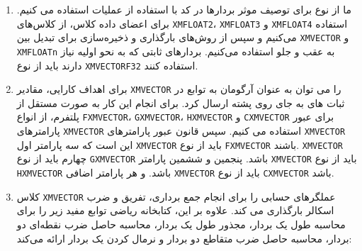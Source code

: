 {\begin{spacing}{1.5}
\begin{enumerate}
            \item {ما از نوع  برای توصیف موثر بردارها در کد با استفاده از عملیات  استفاده می کنیم.
            برای اعضای داده کلاس، از کلاس‌های \texttt{XMFLOAT2}، \texttt{XMFLOAT3} و \texttt{XMFLOAT4} استفاده می‌کنیم و
            سپس از روش‌های بارگذاری و ذخیره‌سازی برای تبدیل بین \texttt{XMVECTOR} و \texttt{XMFLOATn} به عقب و جلو استفاده می‌کنیم.
            بردارهای ثابتی که به نحو اولیه نیاز دارند باید از نوع \texttt{XMVECTORF32} استفاده کنند.}
            \\
            \item {برای اهداف کارایی، مقادیر \texttt{XMVECTOR} را می توان به عنوان آرگومان به توابع در ثبات های  به جای روی پشته ارسال کرد.
            برای انجام این کار به صورت مستقل از پلتفرم، از انواع \texttt{FXMVECTOR}، \texttt{GXMVECTOR}، \texttt{HXMVECTOR} و \texttt{CXMVECTOR} برای عبور پارامترهای \texttt{XMVECTOR} استفاده می کنیم.
            سپس قانون عبور پارامترهای \texttt{XMVECTOR} این است که سه پارامتر اول \texttt{XMVECTOR} باید از نوع \texttt{FXMVECTOR} باشند. \texttt{XMVECTOR} چهارم باید از نوع \texttt{GXMVECTOR} باشد.
            پنجمین و ششمین پارامتر \texttt{XMVECTOR} باید از نوع \texttt{HXMVECTOR} باشد. و هر پارامتر اضافی \texttt{XMVECTOR} باید از نوع \texttt{CXMVECTOR} باشد.}
            \\
            \item {کلاس \texttt{XMVECTOR} عملگرهای حسابی را برای انجام جمع برداری، تفریق و ضرب اسکالر بارگذاری می کند.
            علاوه بر این، کتابخانه ریاضی  توابع مفید زیر را برای محاسبه طول یک بردار، مجذور طول یک بردار، محاسبه حاصل ضرب نقطه‌ای دو بردار، محاسبه حاصل ضرب متقاطع دو بردار و نرمال کردن یک بردار ارائه می‌کند:
            \textbf{\vspace{6pt}}
            \lr{}
            }
        \end{enumerate}
    \end{spacing}
}

\textbf{\vspace{20pt}}
